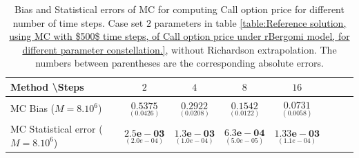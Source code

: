 \documentclass[11pt]{article}
\begin{document}
\begin{table}[h!]
	\centering
	\begin{tabular}{l*{6}{c}r}
		Method \textbackslash  Steps            & $2$ & $4$ & $8$ & $16$  \\
		\hline
		MC Bias ($M=8.10^6$)   & $\underset{(0.0426)}{\mathbf{0.5375
		}}$  & $\underset{ (  0.0208)}{\mathbf{0.2922}}$  & $\underset{(  0.0122)}{\mathbf{0.1542}}$ & $\underset{( 0.0058)}{\mathbf{0.0731}}$  \\	
		
			MC Statistical error ($M=8.10^6$)  & $\underset{( 2.0e-04)}{\mathbf{2.5e-03}}$  & $\underset{(  1.0e-04)}{\mathbf{1.3e-03}}$  & $\underset{(  5.0e-05)}{\mathbf{6.3e-04}}$ & $\underset{(  1.1e-04)}{\mathbf{1.33e-03}}$ \\	
				
		\hline
	\end{tabular}
	\caption{Bias and Statistical errors of MC  for computing Call option price  for different number of time steps. Case set $2$ parameters in table \ref{table:Reference solution, using MC with $500$ time steps, of Call option price under rBergomi model, for different parameter constellation.}, without Richardson extrapolation. The numbers between parentheses are the corresponding absolute errors.}
	\label{Bias and Statistical errors of MC ($M=10^6$)  for computing Call option price  for different number of time steps. Case set $2$ parameters, without Richardson extrapolation. The numbers between parentheses are the corresponding absolute errors.}
\end{table}
\end{document}
